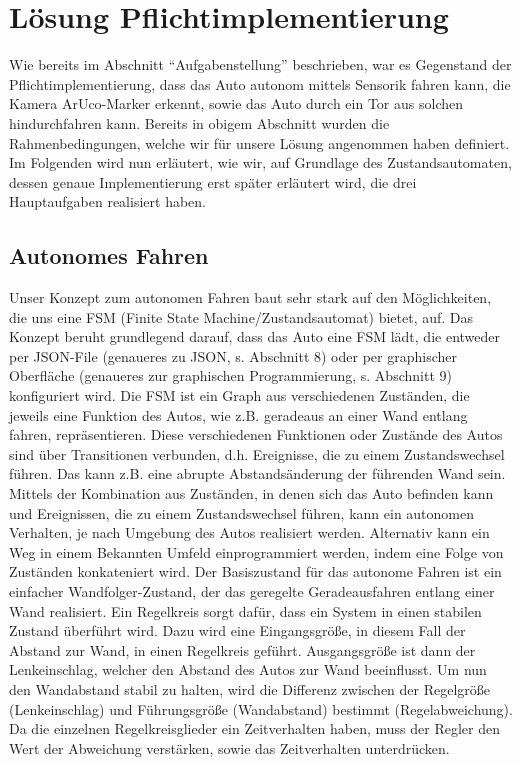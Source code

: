 \section{L\"osung Pflichtimplementierung}
\label{sec:lsgpflicht}

Wie bereits im Abschnitt "`Aufgabenstellung"' beschrieben, war es Gegenstand der Pflichtimplementierung, dass das Auto autonom mittels Sensorik fahren kann, die Kamera ArUco-Marker erkennt, sowie das Auto durch ein Tor aus solchen hindurchfahren kann. Bereits in obigem Abschnitt wurden die Rahmenbedingungen, welche wir für unsere Lösung angenommen haben definiert. Im Folgenden wird nun erläutert, wie wir, auf Grundlage des Zustandsautomaten, dessen genaue Implementierung erst später erläutert wird, die drei Hauptaufgaben realisiert haben.

\subsection{Autonomes Fahren}
Unser Konzept zum autonomen Fahren baut sehr stark auf den Möglichkeiten, die uns eine FSM (Finite State Machine/Zustandsautomat) bietet, auf. 
Das Konzept beruht grundlegend darauf, dass das Auto eine FSM lädt, die entweder per JSON-File (genaueres zu JSON, s. Abschnitt 8) oder per graphischer Oberfläche (genaueres zur graphischen Programmierung, s. Abschnitt 9) konfiguriert wird. Die FSM ist ein Graph aus verschiedenen Zuständen, die jeweils eine Funktion des Autos, wie z.B. geradeaus an einer Wand entlang fahren, repräsentieren. Diese verschiedenen Funktionen oder Zustände des Autos sind über Transitionen verbunden, d.h. Ereignisse, die zu einem Zustandswechsel führen. Das kann z.B. eine abrupte Abstandsänderung der führenden Wand sein.
\newline 
Mittels der Kombination aus Zuständen, in denen sich das Auto befinden kann und Ereignissen, die zu einem Zustandswechsel führen, kann ein autonomen Verhalten, je nach Umgebung des Autos realisiert werden. Alternativ kann ein Weg in einem Bekannten Umfeld einprogrammiert werden, indem eine Folge von Zuständen konkateniert wird. 
Der Basiszustand für das autonome Fahren ist ein einfacher Wandfolger-Zustand, der das geregelte Geradeausfahren entlang einer Wand realisiert. 
\newline
\newline
Ein Regelkreis sorgt dafür, dass ein System in einen stabilen Zustand überführt wird. Dazu wird eine Eingangsgröße, in diesem Fall der Abstand zur Wand, in einen Regelkreis geführt. Ausgangsgröße ist dann der Lenkeinschlag, welcher den Abstand des Autos zur Wand beeinflusst. Um nun den Wandabstand stabil zu halten, wird die Differenz zwischen der Regelgröße (Lenkeinschlag) und Führungsgröße (Wandabstand) bestimmt (Regelabweichung). Da die einzelnen Regelkreisglieder ein Zeitverhalten haben, muss der Regler den Wert der Abweichung verstärken, sowie das Zeitverhalten unterdrücken. 
